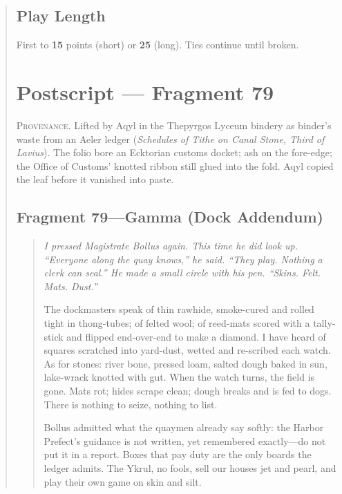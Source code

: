\documentclass[11pt]{article}
\begin{document}
\begin{quote}
\subsection*{Play Length}
First to \textbf{15} points (short) or \textbf{25} (long). Ties continue until broken.


\clearpage

\section*{Postscript — Fragment 79}
\label{sec:postscript}

\medskip
\noindent\small\textsc{Provenance.} Lifted by Aqyl in the Thepyrgos Lyceum bindery as binder’s waste from an Aeler ledger (\emph{Schedules of Tithe on Canal Stone, Third of Lavius}). The folio bore an Ecktorian customs docket; ash on the fore-edge; the Office of Customs’ knotted ribbon still glued into the fold. Aqyl copied the leaf before it vanished into paste.\normalsize

\medskip
\subsection*{Fragment 79—Gamma (Dock Addendum)}
\begin{quote}\small\itshape
\noindent I pressed Magistrate Bollus again. This time he did look up. “Everyone along the quay knows,” he said. “They play. Nothing a clerk can seal.” He made a small circle with his pen. “Skins. Felt. Mats. Dust.”

\medskip
\noindent The dockmasters speak of thin rawhide, smoke-cured and rolled tight in thong-tubes; of felted wool; of reed-mats scored with a tally-stick and flipped end-over-end to make a diamond. I have heard of squares scratched into yard-dust, wetted and re-scribed each watch. As for stones: river bone, pressed loam, salted dough baked in sun, lake-wrack knotted with gut. When the watch turns, the field is gone. Mats rot; hides scrape clean; dough breaks and is fed to dogs. There is nothing to seize, nothing to list.

\medskip
\noindent Bollus admitted what the quaymen already say softly: the Harbor Prefect’s guidance is not written, yet remembered exactly—do not put it in a report. Boxes that pay duty are the only boards the ledger admits. The Ykrul, no fools, sell our houses jet and pearl, and play their own game on skin and silt.


\end{quote}
\end{quote}
\end{document}
